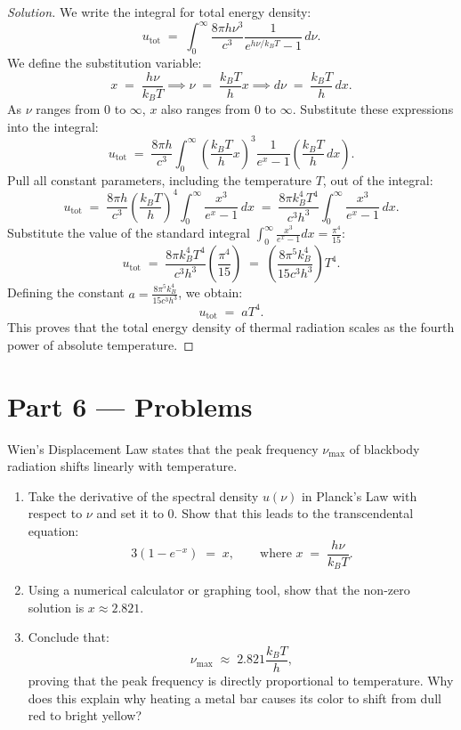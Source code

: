 \documentclass[12pt, a4paper, twoside]{book}
\newcounter{problem}[chapter]
\begin{document}
\begin{proof}[Solution]
We write the integral for total energy density:
\[
  u_{\text{tot}} \;=\; \int_0^\infty \frac{8\pi h \nu^3}{c^3} \frac{1}{e^{h\nu/k_B T} - 1} \, d\nu.
\]
We define the substitution variable:
\[
  x \;=\; \frac{h\nu}{k_B T} \implies \nu \;=\; \frac{k_B T}{h} x \implies d\nu \;=\; \frac{k_B T}{h} \, dx.
\]
As $\nu$ ranges from $0$ to $\infty$, $x$ also ranges from $0$ to $\infty$. Substitute these expressions into the integral:
\[
  u_{\text{tot}} \;=\; \frac{8\pi h}{c^3} \int_0^\infty \left( \frac{k_B T}{h} x \right)^3 \frac{1}{e^x - 1} \left( \frac{k_B T}{h} \, dx \right).
\]
Pull all constant parameters, including the temperature $T$, out of the integral:
\[
  u_{\text{tot}} \;=\; \frac{8\pi h}{c^3} \left( \frac{k_B T}{h} \right)^4 \int_0^\infty \frac{x^3}{e^x - 1} \, dx \;=\; \frac{8\pi k_B^4 T^4}{c^3 h^3} \int_0^\infty \frac{x^3}{e^x - 1} \, dx.
\]
Substitute the value of the standard integral $\int_0^\infty \frac{x^3}{e^x - 1} dx = \frac{\pi^4}{15}$:
\[
  u_{\text{tot}} \;=\; \frac{8\pi k_B^4 T^4}{c^3 h^3} \left( \frac{\pi^4}{15} \right) \;=\; \left( \frac{8\pi^5 k_B^4}{15 c^3 h^3} \right) T^4.
\]
Defining the constant $a = \frac{8\pi^5 k_B^4}{15 c^3 h^3}$, we obtain:
\[
  u_{\text{tot}} \;=\; a T^4.
\]
This proves that the total energy density of thermal radiation scales as the fourth power of absolute temperature.
\end{proof}

\newpage

\section{Part 6 --- Problems}

\begin{problem}
Wien's Displacement Law states that the peak frequency $\nu_{\text{max}}$ of blackbody radiation shifts linearly with temperature.
\begin{enumerate}[label=(\alph*)]
  \item Take the derivative of the spectral density $u(\nu)$ in Planck's Law with respect to $\nu$ and set it to 0. Show that this leads to the transcendental equation:
  \[
    3\left(1 - e^{-x}\right) \;=\; x, \qquad \text{where } x \;=\; \frac{h\nu}{k_B T}.
  \]
  \item Using a numerical calculator or graphing tool, show that the non-zero solution is $x \approx 2.821$.
  \item Conclude that:
  \[
    \nu_{\text{max}} \;\approx\; 2.821 \frac{k_B T}{h},
  \]
  proving that the peak frequency is directly proportional to temperature. Why does this explain why heating a metal bar causes its color to shift from dull red to bright yellow?
\end{enumerate}
\end{problem}
\end{document}
